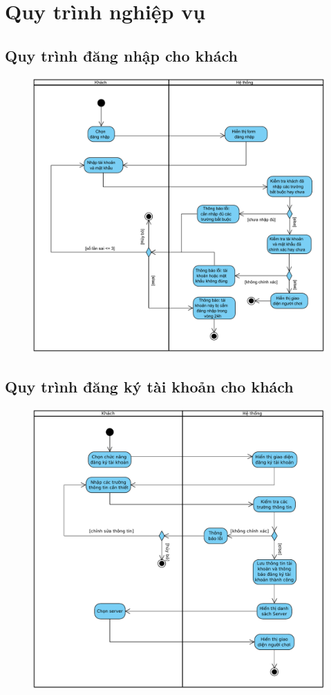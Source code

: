 \documentclass[3p]{elsarticle}
\begin{document}
\section{Quy trình nghiệp vụ}
\subsection{Quy trình đăng nhập cho khách}
\begin{figure}[!htbp]
\centering
\includegraphics[scale=.6]{images/activities/login.pdf}
\end{figure}
\newpage
\subsection{Quy trình đăng ký tài khoản cho khách}
\begin{figure}[!htbp]
	\centering
	\includegraphics[scale=.7]{images/activities/signup.pdf}
\end{figure}
%
\newpage
\end{document}
